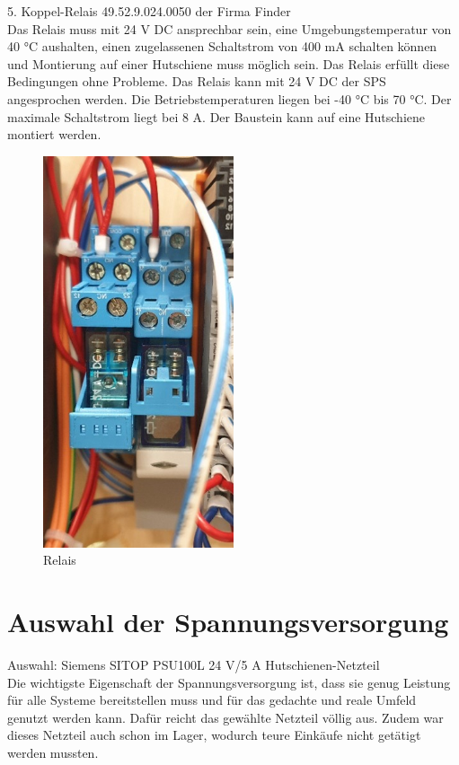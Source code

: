 \documentclass[10pt,a4paper]{report}
\begin{document}
	5. Koppel-Relais 49.52.9.024.0050 der Firma Finder\\
	Das Relais muss mit 24 V DC ansprechbar sein, eine Umgebungstemperatur von 40 °C aushalten, einen zugelassenen  Schaltstrom von 400 mA schalten können und Montierung auf einer Hutschiene muss möglich sein.
	Das Relais erfüllt diese Bedingungen ohne Probleme. Das Relais kann mit 24 V DC der SPS angesprochen werden. Die Betriebstemperaturen liegen bei -40 °C bis 70 °C. Der maximale Schaltstrom liegt bei 8 A. Der Baustein kann auf eine Hutschiene montiert werden.
	\begin{figure}[htb]
		\includegraphics[width=0.5\textwidth]{Relais}
		\centering
		\caption{Relais}
	\end{figure}

	\section{Auswahl der Spannungsversorgung}
	Auswahl: Siemens SITOP PSU100L 24 V/5 A Hutschienen-Netzteil\\
	Die wichtigste Eigenschaft der Spannungsversorgung ist, dass sie genug Leistung für alle Systeme bereitstellen muss und für das gedachte und reale Umfeld genutzt werden kann. Dafür reicht das gewählte Netzteil völlig aus. Zudem war dieses Netzteil auch schon im Lager, wodurch teure Einkäufe nicht getätigt werden mussten. 
	
\end{document}
